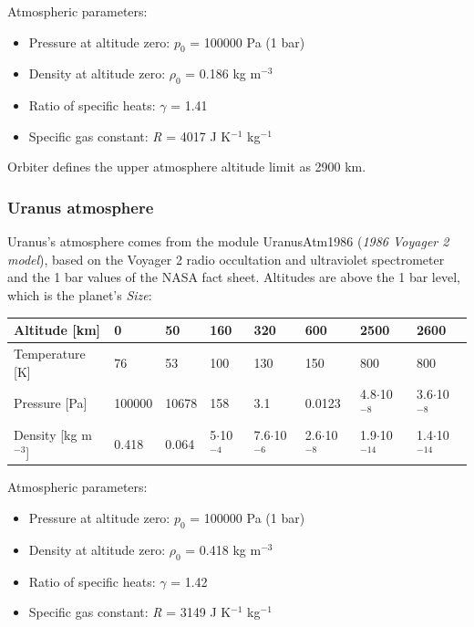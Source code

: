 \documentclass[Orbiter Developer Manual.tex]{subfiles}
\begin{document}
\noindent
Atmospheric parameters:

\begin{itemize}
\item Pressure at altitude zero: $p_{0}$ = 100000 Pa (1 bar)
\item Density at altitude zero: $\rho_{0}$ = 0.186 kg m$^{-3}$
\item Ratio of specific heats: $\gamma$ = 1.41
\item Specific gas constant: \textit{R} = 4017 J K$^{-1}$ kg$^{-1}$
\end{itemize}

\noindent
Orbiter defines the upper atmosphere altitude limit as 2900 km.


\subsubsection{Uranus atmosphere}
Uranus's atmosphere comes from the module UranusAtm1986 (\textit{1986 Voyager 2 model}), based on the Voyager 2 radio occultation and ultraviolet spectrometer and the 1 bar values of the NASA fact sheet. Altitudes are above the 1 bar level, which is the planet's \textit{Size}:

{\setlength{\tabcolsep}{3pt}
	\begin{longtable}{ |p{}|p{}|p{}|p{}|p{}|p{}|p{}|p{}| }
	\hline\rule{0pt}{2ex}
	Altitude [km] & 0 & 50 & 160 & 320 & 600 & 2500 & 2600\\
	\hline\rule{0pt}{2ex}
	Temperature [K] & 76 & 53 & 100 & 130 & 150 & 800 & 800\\
	\hline\rule{0pt}{2ex}
	Pressure [Pa] & 100000 & 10678 & 158 & 3.1 & 0.0123 & 4.8$\cdot$10$^{-8}$ & 3.6$\cdot$10$^{-8}$\\
	\hline\rule{0pt}{2ex}
	Density [kg m$^{-3}$] & 0.418 & 0.064 & 5$\cdot$10$^{-4}$ & 7.6$\cdot$10$^{-6}$ & 2.6$\cdot$10$^{-8}$ & 1.9$\cdot$10$^{-14}$ & 1.4$\cdot$10$^{-14}$\\
	\hline
	\end{longtable}
}

\noindent
Atmospheric parameters:

\begin{itemize}
\item Pressure at altitude zero: $p_{0}$ = 100000 Pa (1 bar)
\item Density at altitude zero: $\rho_{0}$ = 0.418 kg m$^{-3}$
\item Ratio of specific heats: $\gamma$ = 1.42
\item Specific gas constant: \textit{R} = 3149 J K$^{-1}$ kg$^{-1}$
\end{itemize}
\end{document}
